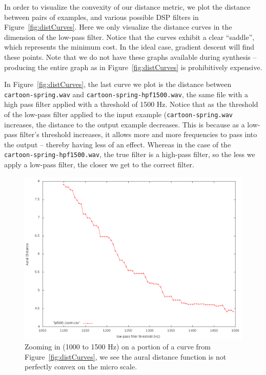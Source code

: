 In order to visualize the convexity of our distance metric, we plot the distance between pairs of examples, and various possible DSP filters in Figure~\ref{fig:distCurves}.
Here we only visualize the distance curves in the dimension of the low-pass filter.
Notice that the curves exhibit a clear ``saddle'', which represents the minimum cost.
In the ideal case, gradient descent will find these points.
Note that we do not have these graphs available during synthesis -- producing the entire graph as in Figure~\ref{fig:distCurves} is prohibitively expensive.

In Figure~\ref{fig:distCurves}, the last curve we plot is the distance between \texttt{cartoon-spring.wav} and \texttt{cartoon-spring-hpf1500.wav}, the same file with a high pass filter applied with a threshold of 1500 Hz.
Notice that as the threshold of the low-pass filter applied to the input example (\texttt{cartoon-spring.wav} increases, the distance to the output example decreases. 
This is because as a low-pass filter's threshold increases, it allows more and more frequencies to pass into the output -- thereby having less of an effect.
Whereas in the case of the \texttt{cartoon-spring-hpf1500.wav}, the true filter is a high-pass filter, so the less we apply a low-pass filter, the closer we get to the correct filter.

\begin{figure}
\includegraphics[width=\columnwidth]{figs/distCurveZoom} 
\caption{Zooming in (1000 to 1500 Hz) on a portion of a curve from Figure~\ref{fig:distCurves}, we see the aural distance function is not perfectly convex on the micro scale.}
\label{fig:microDist}
\end{figure}


